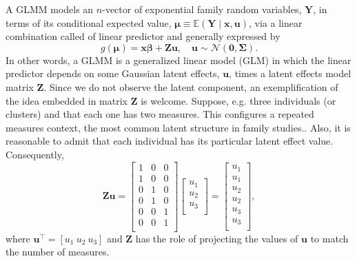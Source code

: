 A GLMM \cite{GLMM} models an \(n\)-vector of exponential family random
variables, \(\mathbf{Y}\), in terms of its conditional expected value,
\(\bm{\mu} \equiv \mathbb{E}(\mathbf{Y} \mid \bm{x}, \mathbf{u})\), via
a linear combination called of linear predictor and generally expressed
by
\begin{equation}
  g(\bm{\mu}) = \bm{x} \bm{\beta} + \mathbf{Zu}, \quad
  \mathbf{u} \sim \mathcal{N}(\mathbf{0}, \bm{\Sigma}).
  \label{eq:gmu}
\end{equation}
In other words, a GLMM is a generalized linear model (GLM) in which the
linear predictor depends on some Gaussian latent effects,
\(\mathbf{u}\), times a latent effects model matrix \(\mathbf{Z}\).
Since we do not observe the latent component, an exemplification of the
idea embedded in matrix \(\mathbf{Z}\) is welcome. Suppose, e.g. three
individuals (or clusters) and that each one has two measures. This
configures a repeated measures context, the most common latent structure
in family studies.. Also, it is reasonable to admit that each individual
has its particular latent effect value. Consequently,
\[
  \mathbf{Zu} = \begin{bmatrix}
                 1 & 0 & 0\\1 & 0 & 0\\
                 0 & 1 & 0\\0 & 1 & 0\\
                 0 & 0 & 1\\0 & 0 & 1\\
                \end{bmatrix} \begin{bmatrix}
                               u_{1}\\u_{2}\\u_{3}\\
                              \end{bmatrix} = \begin{bmatrix}
                                               u_{1}\\u_{1}\\
                                               u_{2}\\u_{2}\\
                                               u_{3}\\u_{3}\\
                                              \end{bmatrix},
\]
where \(\mathbf{u}^{\top} = [u_{1}~u_{2}~u_{3}]\) and \(\mathbf{Z}\) has
the role of projecting the values of \(\mathbf{u}\) to match the number
of measures.

